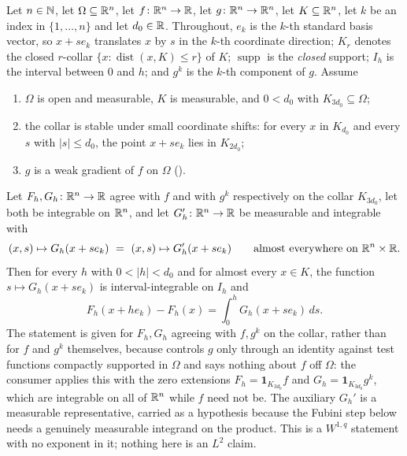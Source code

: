 \begin{helper}
Let $n\in\mathbb{N}$, let $\Omega\subseteq\mathbb{R}^n$, let $f\colon\mathbb{R}^n\to\mathbb{R}$, let
$g\colon\mathbb{R}^n\to\mathbb{R}^n$, let $K\subseteq\mathbb{R}^n$, let $k$ be an index in
$\{1,\dots,n\}$ and let $d_0\in\mathbb{R}$.  Throughout, $e_k$ is the $k$-th standard
basis vector, so $x+se_k$ translates $x$ by $s$ in the $k$-th coordinate
direction; $K_r$ denotes the closed $r$-collar
$\{x:\operatorname{dist}(x,K)\le r\}$ of $K$; $\operatorname{supp}$ is the
\emph{closed} support; $I_h$ is the interval between $0$ and $h$; and $g^k$ is
the $k$-th component of $g$.  Assume
\begin{enumerate}
\item[(H1)] $\Omega$ is open and measurable, $K$ is measurable, and $0<d_0$
  with $K_{3d_0}\subseteq\Omega$;
\item[(H2)] the collar is stable under small coordinate shifts: for every $x$
  in $K_{d_0}$ and every $s$ with $|s|\le d_0$, the point $x+se_k$ lies in
  $K_{2d_0}$;
\item[(H3)] $g$ is a weak gradient of $f$ on $\Omega$
  ().
\end{enumerate}
Let $F_h,G_h\colon\mathbb{R}^n\to\mathbb{R}$ agree with $f$ and with $g^k$ respectively on the
collar $K_{3d_0}$, let both be integrable on $\mathbb{R}^n$, and let
$G_h'\colon\mathbb{R}^n\to\mathbb{R}$ be measurable and integrable with
\[
(x,s)\mapsto G_h(x+se_k)\ =\ (x,s)\mapsto G_h'(x+se_k)
\qquad\text{almost everywhere on }\mathbb{R}^n\times\mathbb{R} .
\]
Then for every $h$ with $0<|h|<d_0$ and for almost every $x\in K$, the function
$s\mapsto G_h(x+se_k)$ is interval-integrable on $I_h$ and
\[
F_h(x+he_k)-F_h(x)=\int_0^hG_h(x+se_k)\,ds .
\]
The statement is given for $F_h,G_h$ agreeing with $f,g^k$ on the collar, rather
than for $f$ and $g^k$ themselves, because  controls
$g$ only through an identity against test functions compactly supported in
$\Omega$ and says nothing about $f$ off $\Omega$: the consumer applies this with
the zero extensions $F_h=\mathbf1_{K_{3d_0}}f$ and
$G_h=\mathbf1_{K_{3d_0}}g^k$, which are integrable on all of $\mathbb{R}^n$ while $f$
need not be.  The auxiliary $G_h'$ is a measurable representative, carried as a
hypothesis because the Fubini step below needs a genuinely measurable integrand
on the product.  This is a $W^{1,q}$ statement with no exponent in it; nothing
here is an $L^2$ claim.
\end{helper}
